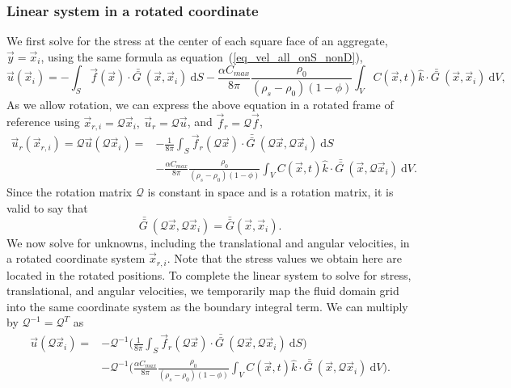 \subsubsection{Linear system in a rotated coordinate}
We first solve for the stress at the center of each square face of an aggregate, $\vec{y} = \vec{x}_i$, 
using the same formula as equation~(\ref{eq_vel_all_onS_nonD}),
\begin{equation}
	\vec{u} \left(\vec{x}_i \right) 
		  = -\int_{S}  
		 \vec{f}(\vec{x}) 
		 \cdot \bar{\bar{G \ }} (\vec{x}, \vec{x}_i) 
		 \ \textrm{d}S 
		 - \frac{ \alpha C_{max}}{8\pi } \frac{\rho_0}{(\rho_s - \rho_0)(1-\phi)}
		 \int_V  C \left(\vec{x} ,t \right) \hat{k} \cdot
		 \bar{\bar{G \ }}(\vec{x}, \vec{x}_i)
		 \ \text{d}V,
		 \nonumber
\end{equation}
As we allow rotation, we can express the above equation in a rotated frame of reference using $\vec{x}_{r, i} = \mathcal{Q} \vec{x}_i, \ \vec{u}_r = \mathcal{Q} \vec{u}$, and $\vec{f}_r = \mathcal{Q} \vec{f}$,
\begin{align}
	\vec{u}_r(\vec{x}_{r, i}) =
	\mathcal{Q}
	\vec{u} \left(\mathcal{Q} \vec{x}_i \right) 
		  = & - \frac{1}{8 \pi} \int_{S}  
		 \vec{f}_r(\mathcal{Q} \vec{x}) 
		 \cdot \bar{\bar{G \ }} (\mathcal{Q} \vec{x},\mathcal{Q}\vec{x}_i) 
		 \ \textrm{d}S
		 \nonumber \\
		 & - \frac{ \alpha C_{max}}{8\pi } \frac{\rho_0}{(\rho_s - \rho_0)(1-\phi)}
		 \int_V  C \left(\vec{x} ,t \right) \hat{k} \cdot
		 \bar{\bar{G \ }}(\vec{x}, \mathcal{Q} \vec{x}_i)
		 \ \text{d}V.
	\label{eq_slp_On_rotate}
\end{align}
Since the rotation matrix $\mathcal{Q}$ is constant in space and is a rotation matrix, it is valid to say that
\[
 \bar{\bar{G \ }} (\mathcal{Q} \vec{x},\mathcal{Q}\vec{x}_i) 
	 = \bar{\bar{G}}( \vec{x}, \vec{x}_i).
\]
We now solve for unknowns, including the translational and angular velocities,
in a rotated coordinate system $\vec{x}_{r,i} $.
Note that the stress values we obtain here 
are located in the rotated positions.  
To complete the linear system to solve for stress, translational, and angular velocities, we temporarily map the fluid domain grid into the same coordinate system as the boundary integral term.
We can multiply by $\mathcal{Q}^{-1} = \mathcal{Q}^{T}$ as 
\begin{align}
	 \vec{u} \left(\mathcal{Q} \vec{x}_i \right) 
		= &
		 -\mathcal{Q}^{-1}
		 \biggl(
		 \frac{1}{8 \pi} \int_{S}  
		 \vec{f}_r(\mathcal{Q} \vec{x}) 
		 \cdot \bar{\bar{G \ }} (\mathcal{Q} \vec{x},\mathcal{Q}\vec{x}_i) 
		 \ \textrm{d}S \biggl)
		 \nonumber \\  
		 & -\mathcal{Q}^{-1}
		 \biggl(
		 \frac{ \alpha C_{max}}{8\pi } \frac{\rho_0}{(\rho_s - \rho_0)(1-\phi)}
		 \int_V  C \left(\vec{x} ,t \right) \hat{k} \cdot
		 \bar{\bar{G \ }}(\vec{x}, \mathcal{Q} \vec{x}_i)
		 \ \text{d}V
		 \biggr).
	\label{eq_slp_vol_R}
\end{align}
